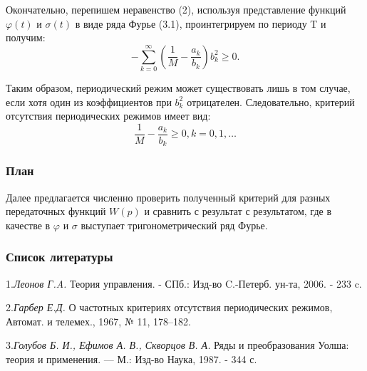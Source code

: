 \documentclass{beamer}
\begin{document}
\begin{frame}\frametitle{}
Окончательно, перепишем неравенство (2), используя представление функций $\varphi(t)$ и $\sigma(t)$ в виде ряда Фурье (3.1), проинтегрируем по периоду T и получим: 
$$ -{\sum\limits^{\infty}_{k=0} {(\frac{1}{M} - \frac{a_k}{b_k}) b_k^2}}\geq 0.$$

Таким образом, периодический режим может существовать лишь в том случае, если хотя один из коэффициентов при $b_k^2$ отрицателен. Следовательно, критерий отсутствия периодических режимов имеет вид: $$ \frac{1}{M} - \frac{a_k}{b_k} \geq 0, k = 0,1,\ldots $$



\end{frame}

\begin{frame}\frametitle{План}
Далее предлагается численно проверить полученный критерий для разных передаточных функций $W(p)$ и сравнить с результат с результатом, где в качестве в $\varphi$ и $\sigma$ выступает тригонометрический ряд Фурье.

\end{frame}


\begin{frame}\frametitle{Список литературы}

1.{\it Леонов Г.A.} Теория управления. - СПб.: Изд-во C.-Петерб. ун-та, 2006. - 233 c.

2.{\it Гарбер Е.Д.} О частотных критериях отсутствия периодических режимов, Автомат. и телемех., 1967, № 11, 178–182.

3.{\it Голубов Б. И., Ефимов А. В., Скворцов В. А.} Ряды и преобразования Уолша: теория и применения. — М.: Изд-во Наука, 1987. - 344 с.

\end{frame}
\end{document}
